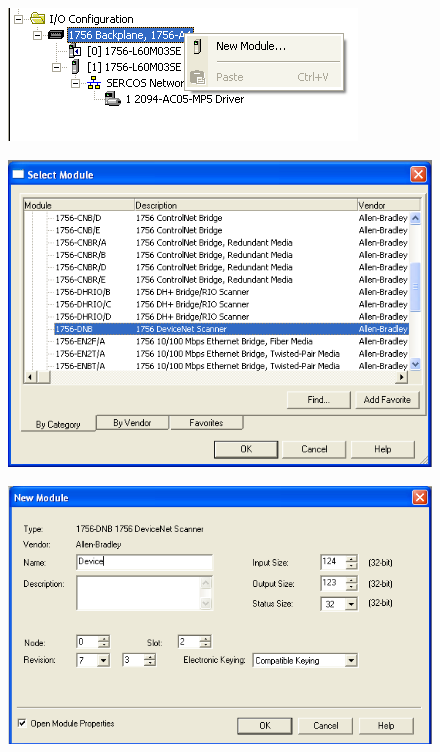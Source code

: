 \documentclass[a4paper,11pt]{scrartcl} %
\numberwithin{equation}{section} %
\numberwithin{figure}{section} %
\numberwithin{table}{section} %
\begin{document}
\begin{enumerate}
  \begin{minipage}[!ht]{\linewidth}
      \centering
      \begin{minipage}{0.45\linewidth}
          \begin{figure}[H]
              \includegraphics[width=\linewidth]{figures/software/step07}
          \end{figure}
      \end{minipage}
      \hspace{0.05\linewidth}
      \begin{minipage}{0.45\linewidth}
          \begin{figure}[H]
              \includegraphics[width=\linewidth]{figures/software/step08}
          \end{figure}
      \end{minipage}
      \begin{minipage}{0.45\linewidth}
          \begin{figure}[H]
              \includegraphics[width=\linewidth]{figures/software/step09}

\end{figure}
\end{minipage}
\end{minipage}
\end{enumerate}
\end{document}
